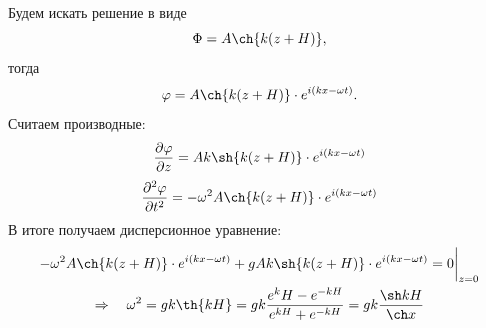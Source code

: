 Будем искать решение в виде
\begin{equation}
	\Phi=A\ch{k(z+H)},
\end{equation}
тогда
\begin{equation}
	\phi=A\ch{k(z+H)}\cdot e^{i(kx- \omega t)}.
\end{equation}
Считаем производные:
\begin{equation}
	\pdv{\phi}{z}=Ak\sh{k(z+H)}\cdot e^{i(kx- \omega t)}
\end{equation}
\begin{equation}
	\pdv[2]{\phi}{t}=-\omega^2A\ch{k(z+H)}\cdot e^{i(kx- \omega t)}
\end{equation}
В итоге получаем дисперсионное уравнение:
\begin{gather}
	\label{eq:disp}
	-\omega^2A\ch{k(z+H)}\cdot e^{i(kx- \omega t)}+gAk\sh{k(z+H)}\cdot e^{i(kx- \omega t)}=0 \bigg|_{z=0}
	\\ \Rightarrow \quad
	\omega^2=gk\th{kH} = gk \frac{e^kH-e^{-kH}}{e^{kH}+e^{-kH}} = gk\frac{\sh kH}{\ch x}
\end{gather}






